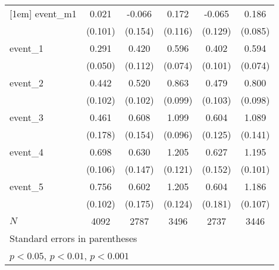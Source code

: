 {\begin{tabular}{l*{5}{c}}
[1em]
event\_m1    &       0.021         &      -0.066         &       0.172         &      -0.065         &       0.186\sym{*}  \\
            &     (0.101)         &     (0.154)         &     (0.116)         &     (0.129)         &     (0.085)         \\
[1em]
event\_1     &       0.291\sym{***}&       0.420\sym{***}&       0.596\sym{***}&       0.402\sym{***}&       0.594\sym{***}\\
            &     (0.050)         &     (0.112)         &     (0.074)         &     (0.101)         &     (0.074)         \\
[1em]
event\_2     &       0.442\sym{***}&       0.520\sym{***}&       0.863\sym{***}&       0.479\sym{***}&       0.800\sym{***}\\
            &     (0.102)         &     (0.102)         &     (0.099)         &     (0.103)         &     (0.098)         \\
[1em]
event\_3     &       0.461\sym{**} &       0.608\sym{***}&       1.099\sym{***}&       0.604\sym{***}&       1.089\sym{***}\\
            &     (0.178)         &     (0.154)         &     (0.096)         &     (0.125)         &     (0.141)         \\
[1em]
event\_4     &       0.698\sym{***}&       0.630\sym{***}&       1.205\sym{***}&       0.627\sym{***}&       1.195\sym{***}\\
            &     (0.106)         &     (0.147)         &     (0.121)         &     (0.152)         &     (0.101)         \\
[1em]
event\_5     &       0.756\sym{***}&       0.602\sym{***}&       1.205\sym{***}&       0.604\sym{***}&       1.186\sym{***}\\
            &     (0.102)         &     (0.175)         &     (0.124)         &     (0.181)         &     (0.107)         \\
\hline
\(N\)       &        4092         &        2787         &        3496         &        2737         &        3446         \\
\hline\hline
\multicolumn{6}{l}{\footnotesize Standard errors in parentheses}\\
\multicolumn{6}{l}{\footnotesize \sym{*} \(p<0.05\), \sym{**} \(p<0.01\), \sym{***} \(p<0.001\)}\\
\end{tabular}
}
